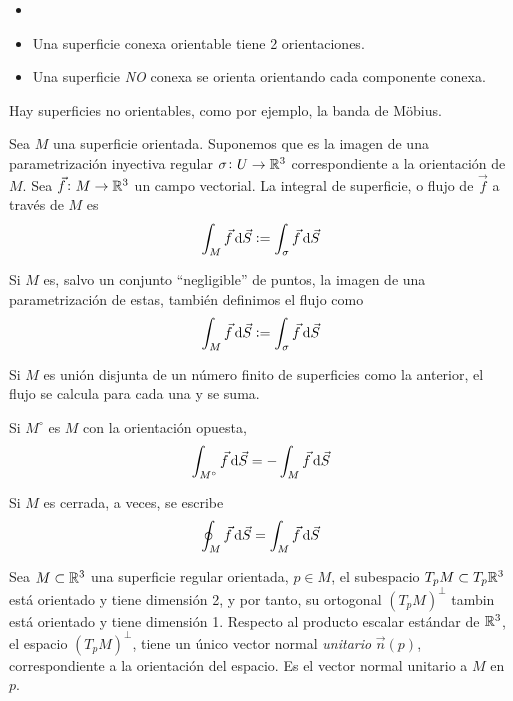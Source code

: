 \begin{obs}
    \begin{itemize}
        \item[]
        \item Una superficie conexa orientable tiene 2 orientaciones.
        \item Una superficie \emph{NO} conexa se orienta orientando cada componente conexa.
    \end{itemize}
\end{obs}
\begin{obs}
    Hay superficies no orientables, como por ejemplo, la banda de Möbius.
\end{obs}

\begin{defi}
    Sea $M$ una superficie orientada. Suponemos que es la imagen de una parametrización inyectiva regular $\sigma \colon U \to \mathbb{R}^3$
    correspondiente a la orientación de $M$. Sea $\vec{f} \colon M \to \mathbb{R}^3$ un campo vectorial. La integral de superficie, o flujo de $\vec{f}$
    a trav\'es de $M$ es
    \[
        \int_M \vec{f} \dif \vec{S} := \int_\sigma \vec{f} \dif \vec{S}
    \]
\end{defi}

\begin{obs}
    Si $M$ es, salvo un conjunto ``negligible'' de puntos, la imagen de una parametrización de estas, tambi\'en definimos el flujo como
    \[
        \int_M \vec{f} \dif \vec{S} := \int_\sigma \vec{f} \dif \vec{S}
    \]

    Si $M$ es unión disjunta de un número finito de superficies como la anterior, el flujo se calcula para cada una y se suma.
\end{obs}

\begin{obs}
    Si $M^\circ$ es $M$ con la orientación opuesta,
    \[
        \int_{M^\circ} \vec{f} \dif \vec{S} = - \int_M \vec{f} \dif \vec{S}
    \]
\end{obs}

\begin{obs}
    Si $M$ es cerrada, a veces, se escribe
    \[
        \oint_M \vec{f} \dif \vec{S} = \int_M \vec{f} \dif \vec{S}
    \]
\end{obs}

\begin{defi}
    Sea $M \subset \mathbb{R}^3$ una superficie regular orientada, $p \in M$, el subespacio $T_pM \subset T_p\mathbb{R}^3$ está orientado y tiene
    dimensión 2, y por tanto, su ortogonal $\left( T_pM \right)^\perp$ tambin está orientado y tiene dimensión 1. Respecto al producto
    escalar estándar de $\mathbb{R}^3$, el espacio $\left( T_pM \right)^\perp$, tiene un único vector normal \emph{unitario} $\vec{n}(p)$, 
    correspondiente a la orientación del espacio. Es el vector normal unitario a $M$ en $p$.
\end{defi}

